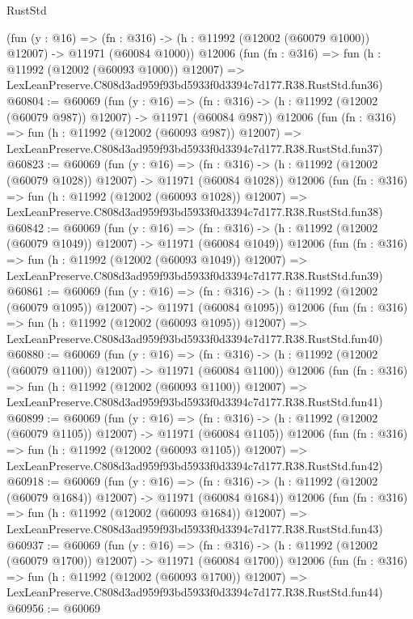 \begin{lexlean}{RustStd}
\begin{coremodule}
    (fun (y : @16) =>
    (fn : @316) -> (h : @11992 (@12002 (@60079 @1000)) @12007) -> @11971 (@60084 @1000))
    @12006
    (fun (fn : @316) =>
    fun (h : @11992 (@12002 (@60093 @1000)) @12007) =>
    LexLeanPreserve.C808d3ad959f93bd5933f0d3394c7d177.R38.RustStd.fun36)
@60804 := @60069
    (fun (y : @16) =>
    (fn : @316) -> (h : @11992 (@12002 (@60079 @987)) @12007) -> @11971 (@60084 @987))
    @12006
    (fun (fn : @316) =>
    fun (h : @11992 (@12002 (@60093 @987)) @12007) =>
    LexLeanPreserve.C808d3ad959f93bd5933f0d3394c7d177.R38.RustStd.fun37)
@60823 := @60069
    (fun (y : @16) =>
    (fn : @316) -> (h : @11992 (@12002 (@60079 @1028)) @12007) -> @11971 (@60084 @1028))
    @12006
    (fun (fn : @316) =>
    fun (h : @11992 (@12002 (@60093 @1028)) @12007) =>
    LexLeanPreserve.C808d3ad959f93bd5933f0d3394c7d177.R38.RustStd.fun38)
@60842 := @60069
    (fun (y : @16) =>
    (fn : @316) -> (h : @11992 (@12002 (@60079 @1049)) @12007) -> @11971 (@60084 @1049))
    @12006
    (fun (fn : @316) =>
    fun (h : @11992 (@12002 (@60093 @1049)) @12007) =>
    LexLeanPreserve.C808d3ad959f93bd5933f0d3394c7d177.R38.RustStd.fun39)
@60861 := @60069
    (fun (y : @16) =>
    (fn : @316) -> (h : @11992 (@12002 (@60079 @1095)) @12007) -> @11971 (@60084 @1095))
    @12006
    (fun (fn : @316) =>
    fun (h : @11992 (@12002 (@60093 @1095)) @12007) =>
    LexLeanPreserve.C808d3ad959f93bd5933f0d3394c7d177.R38.RustStd.fun40)
@60880 := @60069
    (fun (y : @16) =>
    (fn : @316) -> (h : @11992 (@12002 (@60079 @1100)) @12007) -> @11971 (@60084 @1100))
    @12006
    (fun (fn : @316) =>
    fun (h : @11992 (@12002 (@60093 @1100)) @12007) =>
    LexLeanPreserve.C808d3ad959f93bd5933f0d3394c7d177.R38.RustStd.fun41)
@60899 := @60069
    (fun (y : @16) =>
    (fn : @316) -> (h : @11992 (@12002 (@60079 @1105)) @12007) -> @11971 (@60084 @1105))
    @12006
    (fun (fn : @316) =>
    fun (h : @11992 (@12002 (@60093 @1105)) @12007) =>
    LexLeanPreserve.C808d3ad959f93bd5933f0d3394c7d177.R38.RustStd.fun42)
@60918 := @60069
    (fun (y : @16) =>
    (fn : @316) -> (h : @11992 (@12002 (@60079 @1684)) @12007) -> @11971 (@60084 @1684))
    @12006
    (fun (fn : @316) =>
    fun (h : @11992 (@12002 (@60093 @1684)) @12007) =>
    LexLeanPreserve.C808d3ad959f93bd5933f0d3394c7d177.R38.RustStd.fun43)
@60937 := @60069
    (fun (y : @16) =>
    (fn : @316) -> (h : @11992 (@12002 (@60079 @1700)) @12007) -> @11971 (@60084 @1700))
    @12006
    (fun (fn : @316) =>
    fun (h : @11992 (@12002 (@60093 @1700)) @12007) =>
    LexLeanPreserve.C808d3ad959f93bd5933f0d3394c7d177.R38.RustStd.fun44)
@60956 := @60069

\end{coremodule}
\end{lexlean}
